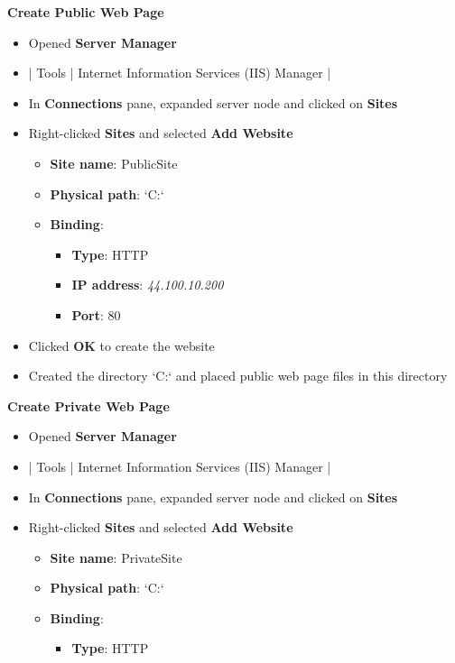 \documentclass[letterpaper]{article}
\begin{document}
\begin{enumerate}
\begin{itemize}
\end{itemize}
\textbf{Create Public Web Page}
\begin{itemize}
\item Opened \textbf{\textbf{Server Manager}}
\item | Tools | Internet Information Services (IIS) Manager |
\item In \textbf{\textbf{Connections}} pane, expanded server node and clicked on \textbf{\textbf{Sites}}
\item Right-clicked \textbf{\textbf{Sites}} and selected \textbf{\textbf{Add Website}}
\begin{itemize}
\item \textbf{\textbf{Site name}}: PublicSite
\item \textbf{\textbf{Physical path}}: `C:\inetpub\wwwroot\public`
\item \textbf{\textbf{Binding}}:
\begin{itemize}
\item \textbf{\textbf{Type}}: HTTP
\item \textbf{\textbf{IP address}}: \emph{44.100.10.200}
\item \textbf{\textbf{Port}}: 80
\end{itemize}
\end{itemize}
\item Clicked \textbf{\textbf{OK}} to create the website
\item Created the directory `C:\inetpub\wwwroot\public` and placed public web page files in this directory
\end{itemize}
\textbf{Create Private Web Page}
\begin{itemize}
\item Opened \textbf{\textbf{Server Manager}}
\item | Tools | Internet Information Services (IIS) Manager |
\item In \textbf{\textbf{Connections}} pane, expanded server node and clicked on \textbf{\textbf{Sites}}
\item Right-clicked \textbf{\textbf{Sites}} and selected \textbf{\textbf{Add Website}}
\begin{itemize}
\item \textbf{\textbf{Site name}}: PrivateSite
\item \textbf{\textbf{Physical path}}: `C:\inetpub\wwwroot\private`
\item \textbf{\textbf{Binding}}:
\begin{itemize}
\item \textbf{\textbf{Type}}: HTTP

\end{itemize}
\end{itemize}
\end{itemize}
\end{enumerate}
\end{document}
